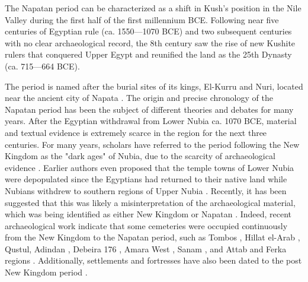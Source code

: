 The Napatan period can be characterized as a shift in Kush's position in the Nile Valley during the first half of the first millennium BCE. Following near five centuries of Egyptian rule (ca. 1550---1070 BCE) and two subsequent centuries with no clear archaeological record, the 8th century saw the rise of new Kushite rulers that conquered Upper Egypt and reunified the land as the 25th Dynasty (ca. 715---664 BCE).


The period is named after the burial sites of its kings, El-Kurru and Nuri, located near the ancient city of Napata \parencite[p.~1]{popeNapatanPeriod2020}. The origin and precise chronology of the Napatan period has been the subject of different theories and debates for many years. After the Egyptian withdrawal from Lower Nubia ca. 1070 BCE, material and textual evidence is extremely scarce in the region for the next three centuries. For many years, scholars have referred to the period following the New Kingdom as the "dark ages" of Nubia, due to the scarcity of archaeological evidence \parencites[p.~250]{adamsNubiaCorridorAfrica1977}[pp.~88, 109-110]{törökKingdomKushHandbook1997}[p.~129]{morkotBlackPharaohsEgypts2000}[pp.~412-413]{williamsNapatanNeoKushiteState2020}. Earlier authors even proposed that the temple towns of Lower Nubia were depopulated since the Egyptians had returned to their native land while Nubians withdrew to southern regions of Upper Nubia \parencites[p.~108-109]{adamsPostPharaonicNubiaLight1964}{firthArchaeologicalReportNubia1912}[p.109]{edwardsNubianArchaeologySudan2004}. Recently, it has been suggested that this was likely a misinterpretation of the archaeological material, which was being identified as either New Kingdom or Napatan \parencites[p.~37]{williamsExcavationsAbuSimbel1990}[p.~109-110]{törökKingdomKushHandbook1997}[p.~415]{williamsNapatanNeoKushiteState2020}. Indeed, recent archaeological work indicate that some cemeteries were occupied continuously from the New Kingdom to the Napatan period, such as Tombos \parencites{buzonEntanglementFormationAncient2016}[p.~7]{smithEthnicityCulture2007}, Hillat el-Arab \parencite{vincentelliHillatElArabJoint2006}, Qustul, Adindan \parencite[p.141]{williamsExcavationsAbuSimbel1992}, Debeira 176 \parencite[p.~200-205]{säve-söderberghScandinavianJointExpedition1989}, Amara West \parencites[p.~57]{spencerCemeteriesLateRamesside2009}{binderCemeteryAmaraWest2011}{binder10th9thCenturyBC2011}, Sanam \parencite{lohwasserAspekteNapatanischenGesellschaft2012}, and Attab and Ferka regions \parencite{budkaEndEgyptianNew2025}. Additionally, settlements and fortresses have also been dated to the post New Kingdom period \parencites[p.~1071-1078]{jesseFendingDesertDwellers2019}[p.~416-417]{williamsNapatanNeoKushiteState2020}.



